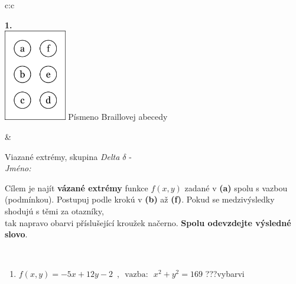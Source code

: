 \documentclass[10pt]{report}
\begin{document}
\begin{tabular}{c:c}
\begin{minipage}[c][104.5mm][t]{0.5\linewidth}
\begin{center}
\begin{minipage}{0.79\linewidth}
\begin{center}
\begin{varwidth}{\linewidth}
\begin{enumerate}
\end{enumerate}
\end{varwidth}
\end{center}
\end{minipage}
\begin{minipage}{0.20\linewidth}
\begin{center}
{\Huge\bfseries 1.} \\[2mm]
\includegraphics[height=40mm]{../images/braille.png}
{\small Písmeno Braillovej abecedy}
\end{center}
\end{minipage}
\end{center}
\end{minipage}
&
\begin{minipage}[c][104.5mm][t]{0.5\linewidth}
\begin{center}
\vspace{7mm}
{\huge Viazané extrémy, skupina \textit{Delta $\delta$} -}\\[5mm]
\textit{Jméno:}\phantom{xxxxxxxxxxxxxxxxxxxxxxxxxxxxxxxxxxxxxxxxxxxxxxxxxxxxxxxxxxxxxxxxx}\\[5mm]
\begin{minipage}{0.95\linewidth}
\begin{center}
Cílem je najít \textbf{vázané extrémy} funkce $f(x,y)$ zadané v \textbf{(a)} spolu s vazbou (podmínkou). Postupuj podle krokú v \textbf{(b)} až \textbf{(f)}. Pokud se medzivýsledky shodujú s těmi za otazníky,\\tak napravo obarvi příslušející kroužek načerno. \textbf{Spolu odevzdejte výsledné slovo}.
\end{center}
\end{minipage}
\\[1mm]
\begin{minipage}{0.79\linewidth}
\begin{center}
\begin{varwidth}{\linewidth}
\begin{enumerate}
\normalsize
\item $f(x,y)=-5x+12y-2 \enspace , \enspace \mathrm{vazba:} \enspace x^2+y^2=169$\quad \dotfill\; ???\;\dotfill \quad vybarvi

\end{enumerate}
\end{varwidth}
\end{center}
\end{minipage}
\end{center}
\end{minipage}
\end{tabular}
\end{document}
